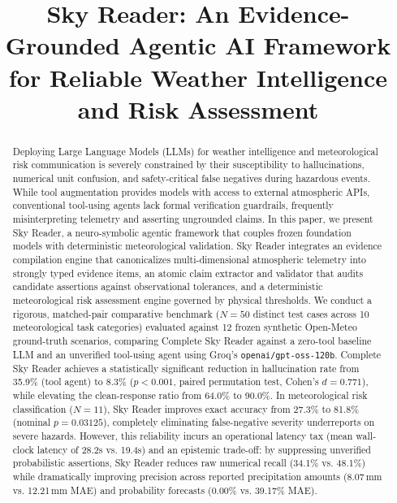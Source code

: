 \documentclass[conference]{IEEEtran}
\begin{document}
\title{Sky Reader: An Evidence-Grounded Agentic AI Framework for Reliable Weather Intelligence and Risk Assessment}

\author{
}

\maketitle

\begin{abstract}
Deploying Large Language Models (LLMs) for weather intelligence and meteorological risk communication is severely constrained by their susceptibility to hallucinations, numerical unit confusion, and safety-critical false negatives during hazardous events. While tool augmentation provides models with access to external atmospheric APIs, conventional tool-using agents lack formal verification guardrails, frequently misinterpreting telemetry and asserting ungrounded claims. In this paper, we present Sky Reader, a neuro-symbolic agentic framework that couples frozen foundation models with deterministic meteorological validation. Sky Reader integrates an evidence compilation engine that canonicalizes multi-dimensional atmospheric telemetry into strongly typed evidence items, an atomic claim extractor and validator that audits candidate assertions against observational tolerances, and a deterministic meteorological risk assessment engine governed by physical thresholds. We conduct a rigorous, matched-pair comparative benchmark ($N=50$ distinct test cases across 10 meteorological task categories) evaluated against 12 frozen synthetic Open-Meteo ground-truth scenarios, comparing Complete Sky Reader against a zero-tool baseline LLM and an unverified tool-using agent using Groq's \texttt{openai/gpt-oss-120b}. Complete Sky Reader achieves a statistically significant reduction in hallucination rate from 35.9\% (tool agent) to 8.3\% ($p < 0.001$, paired permutation test, Cohen's $d = 0.771$), while elevating the clean-response ratio from 64.0\% to 90.0\%. In meteorological risk classification ($N=11$), Sky Reader improves exact accuracy from 27.3\% to 81.8\% (nominal $p = 0.03125$), completely eliminating false-negative severity underreports on severe hazards. However, this reliability incurs an operational latency tax (mean wall-clock latency of 28.2s vs. 19.4s) and an epistemic trade-off: by suppressing unverified probabilistic assertions, Sky Reader reduces raw numerical recall (34.1\% vs. 48.1\%) while dramatically improving precision across reported precipitation amounts (8.07\,mm vs. 12.21\,mm MAE) and probability forecasts (0.00\% vs. 39.17\% MAE).
\end{abstract}
\end{document}

